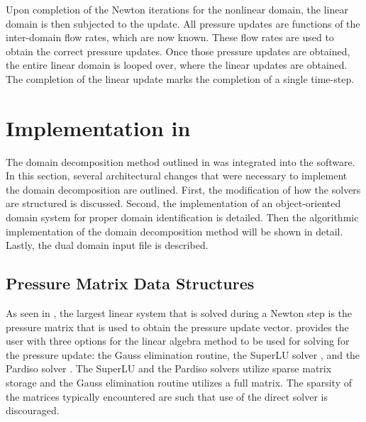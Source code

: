 Upon completion of the Newton iterations for the nonlinear domain, the linear domain is then subjected to the update.
All pressure updates are functions of the inter-domain flow rates, which are now known.
These flow rates are used to obtain the correct pressure updates.
Once those pressure updates are obtained, the entire linear domain is looped over, where the linear updates are obtained.
The completion of the linear update marks the completion of a single time-step.

\section{Implementation in \cobra{}}
\label{sec:dd_algo}

The domain decomposition method outlined in  was integrated into the \cobra{} software.
In this section, several architectural changes that were necessary to implement the domain decomposition are outlined.
First, the modification of how the solvers are structured is discussed.
Second, the implementation of an object-oriented domain system for proper domain identification is detailed.
Then the algorithmic implementation of the domain decomposition method will be shown in detail.
Lastly, the dual domain input file is described.

\subsection{Pressure Matrix Data Structures}
\label{subsect:domDecompSolverStructs}

As seen in , the largest linear system that is solved during a Newton step is the pressure matrix that is used to obtain the pressure update vector.
\cobra{} provides the user with three options for the linear algebra method to be used for solving for the pressure update: the Gauss elimination routine, the SuperLU solver \cite{Li1999}, and the Pardiso solver \cite{Schenk2006, Schenk2007}.
The SuperLU and the Pardiso solvers utilize sparse matrix storage and the Gauss elimination routine utilizes a full matrix.
The sparsity of the matrices typically encountered are such that use of the direct solver is discouraged.

